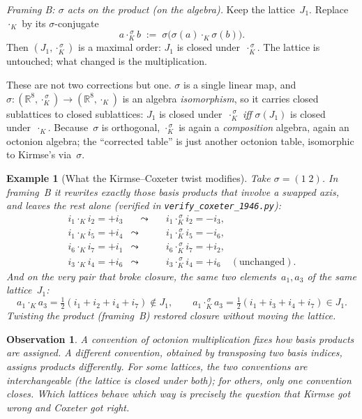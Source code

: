 \documentclass[11pt]{amsart}
\newcommand{\RR}{\mathbb{R}}
\newtheorem*{observation}{Observation}
\newtheorem{example}{Example}[section]
\begin{document}
\smallskip
\noindent\emph{Framing B: $\sigma$ acts on the product (on the
algebra).}  Keep the lattice~$J_1$.  Replace~$\cdot_K$ by its
$\sigma$-conjugate
\[
  a \cdot_K^{\,\sigma} b \;:=\; \sigma\bigl(\sigma(a) \cdot_K \sigma(b)\bigr).
\]
Then $(J_1, \cdot_K^{\,\sigma})$ is a maximal order: $J_1$ is closed
under~$\cdot_K^{\,\sigma}$.  The lattice is untouched; what changed is the
multiplication.

\smallskip
These are not two corrections but one.  $\sigma$ is a single linear map,
and $\sigma\colon (\RR^8, \cdot_K^{\,\sigma}) \to (\RR^8, \cdot_K)$ is an
algebra \emph{isomorphism}, so it carries closed sublattices to closed
sublattices: $J_1$ is closed under~$\cdot_K^{\,\sigma}$ \emph{iff}
$\sigma(J_1)$ is closed under~$\cdot_K$.  Because~$\sigma$ is orthogonal,
$\cdot_K^{\,\sigma}$ is again a \emph{composition} algebra, again an
octonion algebra; the ``corrected table'' is just another octonion
table, isomorphic to Kirmse's via~$\sigma$.

\begin{example}[What the Kirmse--Coxeter twist modifies]
Take $\sigma = (1\;2)$.  In framing~B it rewrites exactly those basis
products that involve a swapped axis, and leaves the rest alone
(verified in \texttt{verify\_coxeter\_1946.py}):
\[
  \begin{array}{lcl}
    i_1 \cdot_K i_2 = +i_3 & \quad\leadsto\quad
      & i_1 \cdot_K^{\,\sigma} i_2 = -i_3, \\[2pt]
    i_1 \cdot_K i_5 = +i_4 & \leadsto
      & i_1 \cdot_K^{\,\sigma} i_5 = -i_6, \\[2pt]
    i_6 \cdot_K i_7 = +i_1 & \leadsto
      & i_6 \cdot_K^{\,\sigma} i_7 = +i_2, \\[2pt]
    i_3 \cdot_K i_4 = +i_6 & \leadsto
      & i_3 \cdot_K^{\,\sigma} i_4 = +i_6 \quad (\text{unchanged}).
  \end{array}
\]
And on the very pair that broke closure, the same two
elements~$a_1, a_3$ of the same lattice~$J_1$:
\[
  a_1 \cdot_K a_3 = \tfrac12(i_1{+}i_2{+}i_4{+}i_7) \notin J_1,
  \qquad
  a_1 \cdot_K^{\,\sigma} a_3 = \tfrac12(i_1{+}i_3{+}i_4{+}i_7) \in J_1.
\]
Twisting the product (framing~B) restored closure without moving the
lattice.
\end{example}

\begin{observation}
A convention of octonion multiplication fixes how basis products
are assigned.  A different convention, obtained by transposing two
basis indices, assigns products differently.  For some lattices, the
two conventions are interchangeable (the lattice is closed under
both); for others, only one convention closes.  Which lattices
behave which way is precisely the question that Kirmse got wrong
and Coxeter got right.
\end{observation}
\end{document}
